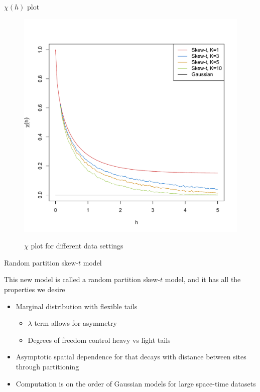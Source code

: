 \documentclass{beamer}
\begin{document}
\begin{frame}{$\chi(h)$ plot}
  \vspace{-2em}
  \centering
  \begin{figure}
  \includegraphics[width=.65\linewidth]{./plots/pot/chi-h.pdf}\\[-0.2in]
  \caption{$\chi$ plot for different data settings}
  \end{figure}
\end{frame}

\begin{frame}{Random partition skew-$t$ model}
\begin{adjustwidth}{1em}{0em}
  This new model is called a random partition skew-$t$ model, and it has all the properties we desire \vspace{1em}
  \begin{itemize} \setlength{\itemsep}{1em}
    \item Marginal distribution with flexible tails \vspace{0.5em}
    \begin{itemize} \setlength{\itemsep}{0.5em}
      \item $\lambda$ term allows for asymmetry
      \item Degrees of freedom control heavy vs light tails
    \end{itemize}
    \item Asymptotic spatial dependence for that decays with distance between sites through partitioning
    \item Computation is on the order of Gaussian models for large space-time datasets
  \end{itemize}
\end{adjustwidth}
\end{frame}
\end{document}
